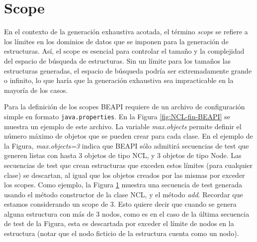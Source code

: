 
\section{Scope}
\label{sec:scope}

En el contexto de la generación exhaustiva acotada, el término \emph{scope} se
refiere a los límites en los dominios de datos que se imponen para la generación de
estructuras. 
Así, el scope es esencial para controlar el tamaño y la complejidad del espacio de búsqueda de estructuras. 
Sin un límite para los tamaños las estructuras generadas,
 el espacio de búsqueda podría ser extremadamente grande o infinito, lo que haría
 que la generación exhaustiva sea impracticable en la mayoría de los casos. 

Para la definición de los scopes BEAPI requiere de un archivo de configuración
simple en formato \texttt{java.properties}. En la Figura \ref{fig:NCL-fin-BEAPI}
se muestra un ejemplo de este archivo. 
La variable \emph{max.objects} permite definir el número
máximo de objetos que se pueden crear para cada clase. En el ejemplo de la
Figura, \emph{max.objects=3} indica que BEAPI sólo admitirá secuencias de test que
generen listas con hasta 3 objetos de tipo NCL, y 3 objetos de tipo Node. Las
secuencias de test que crean estructuras que 
exceden estos límites (para cualquier clase) se descartan, al igual que los
objetos creados por las mismas por exceder los scopes. Como ejemplo, la Figura
\ref{sec:scope} muestra una secuencia de test generada usando el método constructor
de la clase NCL, y el método \emph{add}. Recordar que estamos considerando un scope de 3. 
Esto quiere decir que cuando se genera alguna estructura con más de 3 nodos, como es en 
el caso de la última secuencia de test de la Figura, esta es descartada por exceder el 
límite de nodos en la estructura (notar que el nodo ficticio de la estructura cuenta como un
nodo).


